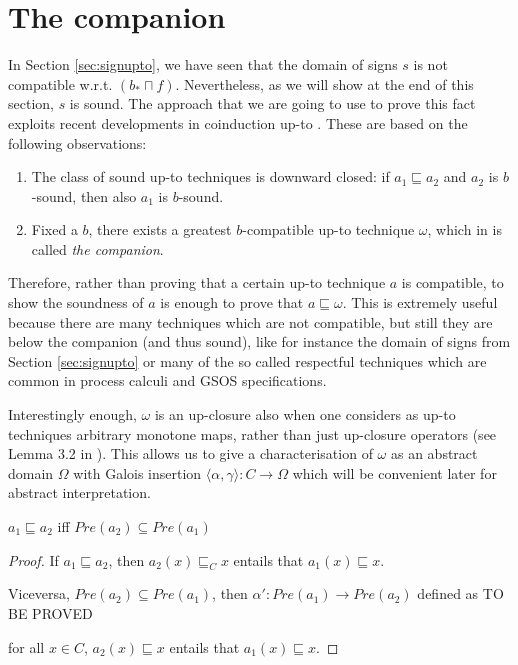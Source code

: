 \documentclass{llncs}
\begin{document}
\section{The companion}
In Section \ref{sec:signupto}, we have seen that the domain of signs $s$ is not compatible w.r.t. $(b_*\sqcap f)$. Nevertheless, as we will show at the end of this section, $s$ is sound.
The approach that we are going to use to prove this fact exploits recent developments in coinduction up-to \cite{hur2013power,pous2016coinduction}. These are based on the following observations:
\begin{enumerate}
\item The class of sound up-to techniques is downward closed: if $a_1\sqsubseteq a_2$ and $a_2$ is $b$-sound, then also $a_1$ is $b$-sound.
\item Fixed a $b$, there exists a greatest $b$-compatible up-to technique $\omega$, which in \cite{pous2016coinduction} is called \emph{the companion}.
\end{enumerate}
Therefore, rather than proving that a certain up-to technique $a$ is compatible, to show the soundness of $a$ is enough to prove that $a \sqsubseteq \omega$. 
%
This is extremely useful because there are many techniques which are not compatible, but still they are below the companion (and thus sound), like for instance the domain of signs from Section \ref{sec:signupto} or many of the so called respectful techniques \cite{San98MFCS} which are common in process calculi and GSOS specifications.

Interestingly enough, $\omega$ is an up-closure also when one considers as up-to techniques arbitrary monotone maps, rather than just up-closure operators (see Lemma 3.2 in \cite{pous2016coinduction}).
This allows us to give a characterisation of $\omega$ as an abstract domain $\Omega$ with Galois insertion $\langle \alpha,\gamma\rangle \colon C \to \Omega$ which will be convenient later for abstract interpretation. %

\begin{lemma}\label{lemma:inclusion}
$a_1\sqsubseteq a_2$ iff $Pre(a_2) \subseteq Pre(a_1)$
\end{lemma}
\begin{proof}
If $a_1\sqsubseteq a_2$, then $a_2(x)\sqsubseteq_C x$ entails that $a_1(x)\sqsubseteq x$. 

Viceversa, $Pre(a_2) \subseteq Pre(a_1)$, then $\alpha'\colon Pre(a_1) \to Pre(a_2)$ defined as TO BE PROVED

for all $x\in C$, $a_2(x) \sqsubseteq x$ entails that $a_1(x) \sqsubseteq x$.
\end{proof}
\end{document}
